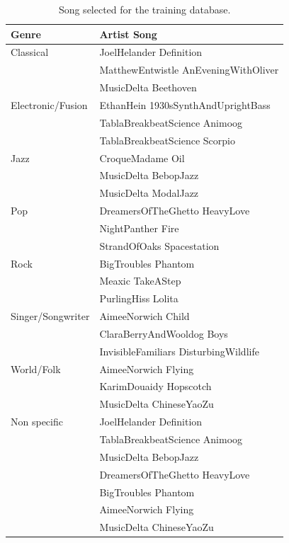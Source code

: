 \documentclass{article}
\begin{document}
\begin{table} 
	\centering 
	\small
   \begin{tabular}{|l|l|}
   \hline
   Genre & Artist Song \\
   	\hline   
Classical  & JoelHelander Definition \\
 & MatthewEntwistle AnEveningWithOliver \\
 & MusicDelta Beethoven \\
\hline
Electronic/Fusion & EthanHein 1930sSynthAndUprightBass \\
 & TablaBreakbeatScience Animoog \\
 & TablaBreakbeatScience Scorpio \\
\hline
Jazz & CroqueMadame Oil \\
 & MusicDelta BebopJazz \\
 & MusicDelta ModalJazz \\
\hline
Pop &  DreamersOfTheGhetto HeavyLove \\
 & NightPanther Fire \\
 & StrandOfOaks Spacestation \\
\hline
Rock & BigTroubles Phantom \\
 & Meaxic TakeAStep \\
 & PurlingHiss Lolita \\
\hline
Singer/Songwriter	& AimeeNorwich Child \\
 & ClaraBerryAndWooldog Boys \\
 & InvisibleFamiliars DisturbingWildlife \\
\hline
World/Folk & AimeeNorwich Flying \\
 &KarimDouaidy Hopscotch \\
 & MusicDelta ChineseYaoZu\\
\hline
Non specific & JoelHelander Definition \\
 & TablaBreakbeatScience Animoog \\
 & MusicDelta BebopJazz \\
 & DreamersOfTheGhetto HeavyLove \\
 &  BigTroubles Phantom \\
 & AimeeNorwich Flying \\
 &  MusicDelta ChineseYaoZu\\
 \hline

  
\end{tabular} 
\caption{\label{trainingdata} Song selected for the training database.}

\end{table}
\end{document}
